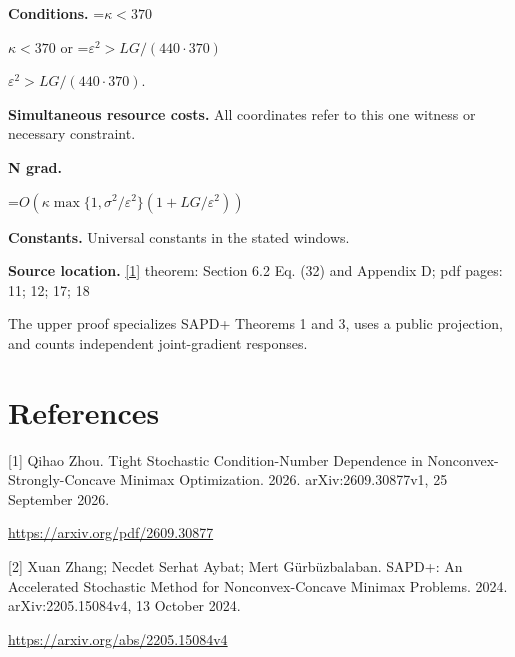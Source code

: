 \documentclass[10pt,a4paper]{article}
\newcommand{\AtlasMath}[1]{\par\begingroup\centering\setbox0=\hbox{$\displaystyle #1$}\ifdim\wd0>1.4\linewidth\typeout{ATLAS WIDE FORMULA: \the\wd0}\fi\ifdim\wd0>\linewidth\resizebox{\linewidth}{!}{\box0}\else\box0\fi\par\endgroup}
\newcommand{\AtlasInlineMath}[1]{\begingroup\setbox0=\hbox{$#1$}\ifdim\wd0>.4\linewidth\endgroup\AtlasMath{#1}\else\endgroup$#1$\fi}
\begin{document}
\textbf{Conditions.} \AtlasInlineMath{\kappa<370} or \AtlasInlineMath{\varepsilon^2>LG/(440\cdot370)}.

\textbf{Simultaneous resource costs.} All coordinates refer to this one witness or necessary constraint.

\textbf{N grad.}

\AtlasMath{O\!\left(\kappa\max\{1,\sigma^2/\varepsilon^2\}\left(1+LG/\varepsilon^2\right)\right)}
\textbf{Constants.} Universal constants in the stated windows.

\textbf{Source location.} \href{https://arxiv.org/pdf/2609.30877}{[1]} theorem: Section 6.2 Eq. (32) and Appendix D; pdf pages: 11; 12; 17; 18

The upper proof specializes SAPD+ Theorems 1 and 3, uses a public projection, and counts independent joint-gradient responses.

\section{References}
[1] Qihao Zhou. Tight Stochastic Condition-Number Dependence in Nonconvex-Strongly-Concave Minimax Optimization. 2026. arXiv:2609.30877v1, 25 September 2026.

\url{https://arxiv.org/pdf/2609.30877}

[2] Xuan Zhang; Necdet Serhat Aybat; Mert Gürbüzbalaban. SAPD+: An Accelerated Stochastic Method for Nonconvex-Concave Minimax Problems. 2024. arXiv:2205.15084v4, 13 October 2024.

\url{https://arxiv.org/abs/2205.15084v4}
\end{document}

